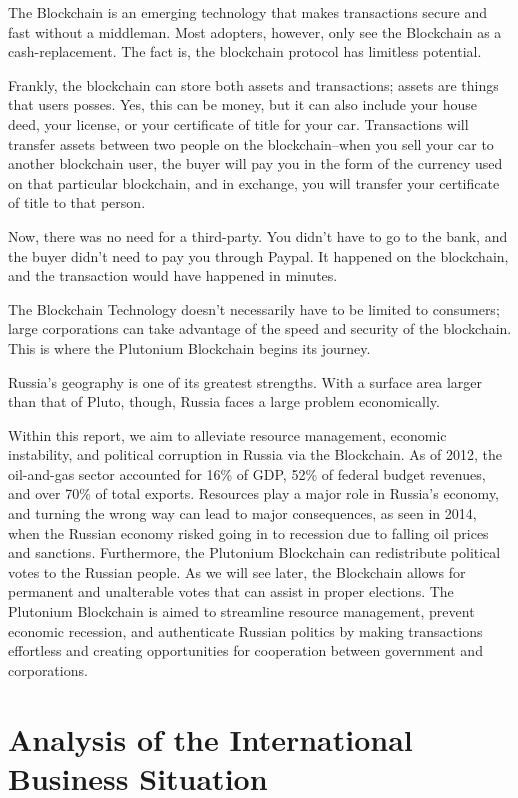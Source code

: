 \documentclass[12pt]{article}
\begin{document}
The Blockchain is an emerging technology that makes transactions secure and fast without a middleman. Most adopters, however, only see the Blockchain as a cash-replacement. The fact is, the blockchain protocol has limitless potential.

Frankly, the blockchain can store both assets and transactions; assets are things that users posses. Yes, this can be money, but it can also include your house deed, your license, or your certificate of title for your car. Transactions will transfer assets between two people on the blockchain--when you sell your car to another blockchain user, the buyer will pay you in the form of the currency used on that particular blockchain, and in exchange, you will transfer your certificate of title to that person.

Now, there was no need for a third-party. You didn't have to go to the bank, and the buyer didn't need to pay you through Paypal. It happened on the blockchain, and the transaction would have happened in minutes.

The Blockchain Technology doesn't necessarily have to be limited to consumers; large corporations can take advantage of the speed and security of the blockchain. This is where the Plutonium Blockchain begins its journey.

Russia's geography is one of its greatest strengths. With a surface area larger than that of Pluto, though, Russia faces a large problem economically.

Within this report, we aim to alleviate resource management, economic instability, and political corruption in Russia via the Blockchain. As of 2012, the oil-and-gas sector accounted for 16\% of GDP, 52\% of federal budget revenues, and over 70\% of total exports. Resources play a major role in Russia's economy, and turning the wrong way can lead to major consequences, as seen in 2014, when the Russian economy risked going in to recession due to falling oil prices and sanctions. Furthermore, the Plutonium Blockchain can redistribute political votes to the Russian people. As we will see later, the Blockchain allows for permanent and unalterable votes that can assist in proper elections. The Plutonium Blockchain is aimed to streamline resource management, prevent economic recession, and authenticate Russian politics by making transactions effortless and creating opportunities for cooperation between government and corporations.
\pagebreak
\section{Analysis of the International Business Situation}
\end{document}
